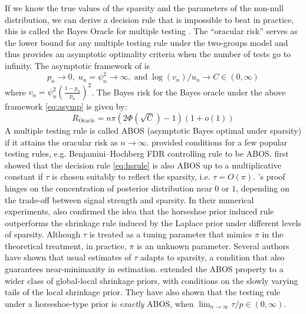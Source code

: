 \documentclass[11pt]{article}
\begin{document}
If we know the true values of the sparsity and the parameters of the non-null distribution, we can derive a decision rule that is impossible to beat in practice, this is called the Bayes Oracle for multiple testing \citep{bogdan2011asymptotic}. The ``oracular risk'' serves as the lower bound for any multiple testing rule under the two-groups model and thus provides an asymptotic optimality criteria when the number of tests go to infinity. The asymptotic framework of \citet{bogdan2011asymptotic} is 
\begin{equation}
p_n \to 0, \; u_n = \psi_n^2 \to \infty, \; \text{and} \; \log(v_n)/u_n \to C \in (0,\infty) \label{eq:asymp}
\end{equation}
where $v_n = \psi_n^2 (\frac{1-p_n}{p_n})^2$. The Bayes risk for the Bayes oracle under the above framework \eqref{eq:asymp} is given by:
\[
R_{\text{Oracle}} = n \pi (2 \Phi(\sqrt{C}) - 1)(1+o(1))
\]
A multiple testing rule is called ABOS (asymptotic Bayes optimal under sparsity) if it attains the oracular risk as $n \to \infty$. \citet{bogdan2011asymptotic} provided conditions for a few popular testing rules, e.g. Benjamini--Hochberg FDR controlling rule to be ABOS. \citet{datta2013asymptotic} first showed that the decision rule \eqref{eq:hsrule} is also ABOS up to a multiplicative constant if $\tau$ is chosen suitably to reflect the sparsity, i.e. $\tau = O(\pi)$. \citet{datta2013asymptotic}'s proof hinges on the concentration of posterior distribution near $0$ or $1$, depending on the trade-off between signal strength and sparsity. In their numerical experiments, \citet{datta2013asymptotic} also confirmed the idea that the horseshoe prior induced rule outperforms the shrinkage rule induced by the Laplace prior under different levels of sparsity. 
Although $\tau$ is treated as a tuning parameter that mimics $\pi$ in the theoretical treatment, in practice, $\pi$ is an unknown parameter. Several authors \cite{datta2013asymptotic, ghosh2016asymptotic, ghosh2016testing,van2016many} have shown that usual estimates of $\tau$ adapts to sparsity, a condition that also guarantees near-minimaxity in estimation. \citet{ghosh2016testing} extended the ABOS property to a wider class of global-local shrinkage priors, with conditions on the slowly varying tails of the local shrinkage prior. They have also shown that the testing rule under a horseshoe-type prior is \textit{exactly} ABOS, when $\lim_{n \to \infty} \tau/p \in (0, \infty)$. 


\end{document}
